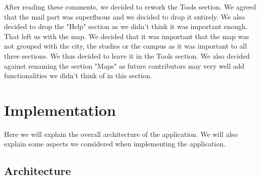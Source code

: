 \documentclass[11pt, a4paper]{report}
\begin{document}

After reading these comments, we decided to rework the Tools section. We agreed that the mail part was superfluous and we decided to drop it entirely. We also decided to drop the "Help" section as we didn't think it was important enough. That left us with the map. We decided that it was important that the map was not grouped with the city, the studies or the campus as it was important to all three sections. We thus decided to leave it in the Tools section. We also decided against renaming the section "Maps" as future contributors may very well add functionalities we didn't think of in this section.

\chapter{Implementation}


Here we will explain the overall architecture of the application. We will also explain some aspects we considered when implementing the application.

\section{Architecture}
\end{document}
